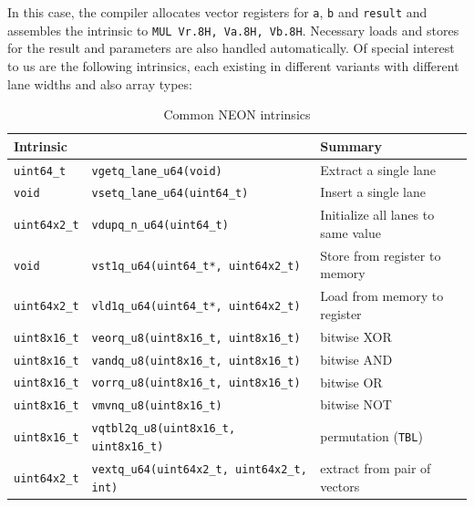 In this case, the compiler allocates vector registers for \texttt{a},
\texttt{b} and \texttt{result} and assembles the intrinsic to \texttt{MUL
Vr.8H, Va.8H, Vb.8H}. Necessary loads and stores for the result and parameters
are also handled automatically. Of special interest to us are the following
intrinsics, each existing in different variants with different lane widths and
also array types: \\

\begin{table}[h!]
    \centering
    \footnotesize
    \caption{Common NEON intrinsics}
    \begin{tabularx}{\textwidth}{llX}
        \toprule
        Intrinsic && Summary \\
        \midrule
        \texttt{uint64\_t} & \texttt{vgetq\_lane\_u64(void)} & Extract a single lane \\
        \midrule
        \texttt{void} & \texttt{vsetq\_lane\_u64(uint64\_t)} & Insert a single lane \\
        \midrule
        \texttt{uint64x2\_t} & \texttt{vdupq\_n\_u64(uint64\_t)} & Initialize all lanes to same value \\
        \midrule
        \texttt{void} & \texttt{vst1q\_u64(uint64\_t*, uint64x2\_t)} & Store from register to memory \\
        \midrule
        \texttt{uint64x2\_t} & \texttt{vld1q\_u64(uint64\_t*, uint64x2\_t)} & Load from memory to register \\
        \midrule
        \texttt{uint8x16\_t} & \texttt{veorq\_u8(uint8x16\_t, uint8x16\_t)} & bitwise XOR \\
        \midrule
        \texttt{uint8x16\_t} & \texttt{vandq\_u8(uint8x16\_t, uint8x16\_t)} & bitwise AND \\
        \midrule
        \texttt{uint8x16\_t} & \texttt{vorrq\_u8(uint8x16\_t, uint8x16\_t)} & bitwise OR \\
        \midrule
        \texttt{uint8x16\_t} & \texttt{vmvnq\_u8(uint8x16\_t)} & bitwise NOT \\
        \midrule
        \texttt{uint8x16\_t} & \texttt{vqtbl2q\_u8(uint8x16\_t, uint8x16\_t)} & permutation (\texttt{TBL}) \\
        \midrule
        \texttt{uint64x2\_t} & \texttt{vextq\_u64(uint64x2\_t, uint64x2\_t, int)} & extract from pair of vectors \\
        \bottomrule
    \end{tabularx}
\end{table}
